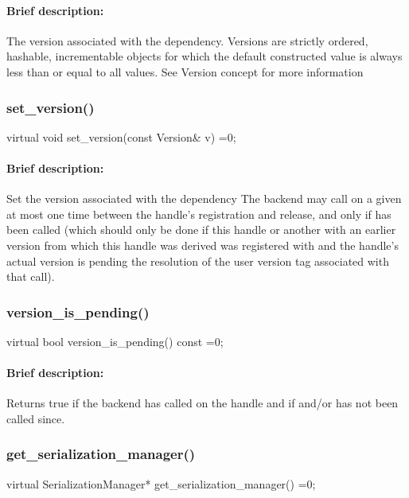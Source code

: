 \paragraph{Brief description:} The version associated with the dependency.
       Versions are strictly ordered, hashable, incrementable objects for which the default constructed
       value is always less than or equal to all values.  See Version concept for more information
     
    
\subsubsection{set\_version()}
\begin{CppCode}
    virtual void
    set_version(const Version& v) =0;
\end{CppCode}

\paragraph{Brief description:} Set the version associated with the dependency
       The backend may call  on a given  at most one time between
       the handle's registration and release, and only if  has been
       called (which should only be done if this handle or another with an earlier version from
       which this handle was derived was registered with 
       and the handle's actual version is pending the resolution of the user version tag associated
       with that call).
     

\subsubsection{version\_is\_pending()}
\begin{CppCode}
    virtual bool
    version_is_pending() const =0;
\end{CppCode}

\paragraph{Brief description:} Returns true if the backend has called  on the handle
       and if  and/or  has not been called since.
     

\subsubsection{get\_serialization\_manager()}
\begin{CppCode}
    virtual SerializationManager*
    get_serialization_manager() =0;
\end{CppCode}


